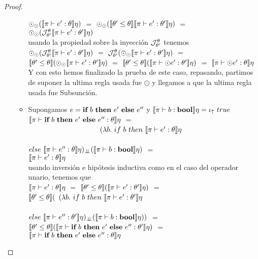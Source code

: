 \begin{proof}
\begin{itemize}
\begin{itemize}
$\odot_{\odot} (\llbracket \pi \vdash e' : \theta \rrbracket\eta)$ $=$
$\odot_{\odot} (\llbracket \theta' \leq \theta \rrbracket\llbracket \pi \vdash e' : \theta' \rrbracket\eta)$ $=$\\
$\odot_{\odot} (\mathcal{J}_{\theta'}^{\theta}\llbracket \pi \vdash e' : \theta' \rrbracket\eta)$\\

usando la propiedad sobre la inyecci\'on $\mathcal{J}_{\theta'}^{\theta}$ tenemos\\

$\odot_{\odot} (\mathcal{J}_{\theta'}^{\theta}\llbracket \pi \vdash e' : \theta' \rrbracket\eta)$ $=$
$\mathcal{J}_{\theta'}^{\theta}(\odot_{\odot} \llbracket \pi \vdash e' : \theta' \rrbracket\eta)$ $=$\\
$\llbracket \theta' \leq \theta \rrbracket(\odot_{\odot} \llbracket \pi \vdash e' : \theta' \rrbracket\eta)$ $=$
$\llbracket \theta' \leq \theta \rrbracket(\llbracket \pi \vdash \odot e' : \theta' \rrbracket\eta)$ $=$
$\llbracket \pi \vdash \odot e' : \theta \rrbracket\eta$\\

Y con esto hemos finalizado la prueba de este caso, repasando, partimos de suponer
la ultima regla usada fue $\odot$ y llegamos a que la ultima regla usada fue Subsunción.

\item Supongamos $e = \textbf{if} \ b \ \textbf{then} \ e' \ \textbf{else} \ e''$ y 
$\semBrcks{\pi \vdash b : \boolt}\eta = \iotabot \ true$\\

$\llbracket \pi \vdash \textbf{if} \ b \ \textbf{then} \ e' \ \textbf{else} \ e'' : \theta \rrbracket\eta$ $=$\\
\indent \ \ \ \ \ \ \ \ \ \ \ \ \ \ \ \ \ \ \ \
$(\lambda b. \ if \ b \ then \ \semBrcks{\pi \vdash e' : \theta}\eta$\\
\indent \ \ \ \ \ \ \ \ \ \ \ \ \ \ \ \ \ \ \ \ \ \ \ \ \ \ \ \ \ \ \ \ \ \ \ \
$else \ \semBrcks{\pi \vdash e'' : \theta}\eta)_{\dbot} 
							(\semBrcks{\pi \vdash b : \boolt}\eta)$ $=$\\
$\llbracket \pi \vdash e' : \theta \rrbracket\eta$\\

usando inversi\'on e hip\'otesis inductiva como en el caso del operador unario, tenemos que\\

$\llbracket \pi \vdash e' : \theta \rrbracket\eta$ $=$ 
$\llbracket \theta' \leq \theta \rrbracket(\llbracket \pi \vdash e' : \theta' \rrbracket\eta)$ $=$\\
$\llbracket \theta' \leq \theta \rrbracket($
$(\lambda b. \ if \ b \ then \ \llbracket \pi \vdash e' : \theta' \rrbracket\eta$\\
\indent \ \ \ \ \ \ \ \ \ \ \ \ \ \ \ \ \ \ \ \ \ \ \ \ \ \ \ \ \ \ \ \
$else \ \semBrcks{\pi \vdash e'' : \theta'}\eta)_{\dbot} 
						(\semBrcks{\pi \vdash b : \boolt}\eta))$ $=$\\
$\llbracket \theta' \leq \theta \rrbracket
	(\llbracket \pi \vdash \textbf{if} \ b \ \textbf{then} \ e' \ \textbf{else} \ e'' : \theta' \rrbracket\eta)$ $=$\\
$\llbracket \pi \vdash \textbf{if} \ b \ \textbf{then} \ e' \ \textbf{else} \ e'' : \theta \rrbracket\eta$\\


\end{itemize}
\end{itemize}
\end{proof}
